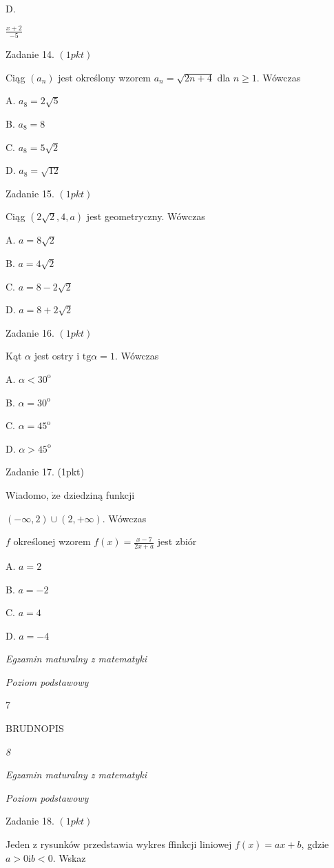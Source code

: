 \documentclass[a4paper,12pt]{article}
\begin{document}
D.

$\displaystyle \frac{x+2}{-5}$

Zadanie 14. $(1pkt)$

Ciąg $(a_{n})$ jest określony wzorem $a_{n}=\sqrt{2n+4}$ dla $n\geq 1$. Wówczas

A. $a_{8}=2\sqrt{5}$

B. $a_{8}=8$

C. $a_{8}=5\sqrt{2}$

D. $a_{8}=\sqrt{12}$

Zadanie 15. $(1pkt)$

Ciąg $(2\sqrt{2},4,a)$ jest geometryczny. Wówczas

A. $a=8\sqrt{2}$

B. $a=4\sqrt{2}$

C. $a=8-2\sqrt{2}$

D. $a=8+2\sqrt{2}$

Zadanie 16. $(1pkt)$

Kąt $\alpha$ jest ostry i $\mathrm{t}\mathrm{g}\alpha=1$. Wówczas

A. $\alpha<30^{\mathrm{o}}$

B. $\alpha=30^{\mathrm{o}}$

C. $\alpha=45^{\mathrm{o}}$

D. $\alpha>45^{\mathrm{o}}$

Zadanie 17. (1pkt)

Wiadomo, $\dot{\mathrm{z}}\mathrm{e}$ dziedziną funkcji

$(-\infty,2)\cup(2,+\infty)$. Wówczas

$f$ określonej wzorem $f(x)=\displaystyle \frac{x-7}{2x+a}$ jest zbiór

A. $a=2$

B. $a=-2$

C. $a=4$

D. $a=-4$





{\it Egzamin maturalny z matematyki}

{\it Poziom podstawowy}

7

BRUDNOPIS





{\it 8}

{\it Egzamin maturalny z matematyki}

{\it Poziom podstawowy}

Zadanie 18. $(1pkt)$

Jeden z rysunków przedstawia wykres ffinkcji liniowej $f(x)=ax+b$, gdzie $a>0\mathrm{i}b<0$. Wskaz
\end{document}
